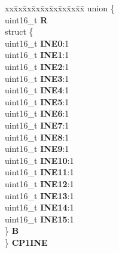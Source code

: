 \begin{DoxyCompactItemize}
\begin{tabbing}
\end{tabbing}\item 
\mbox{\label{structSEMA4__tag_aeee2d21a8dca272e9cb6f40deeca2ea8}} 
\begin{tabbing}
xx\=xx\=xx\=xx\=xx\=xx\=xx\=xx\=xx\=\kill
union \{\\
\>uint16\_t {\bfseries R}\\
\>struct \{\\
\>\>uint16\_t {\bfseries INE0}:1\\
\>\>uint16\_t {\bfseries INE1}:1\\
\>\>uint16\_t {\bfseries INE2}:1\\
\>\>uint16\_t {\bfseries INE3}:1\\
\>\>uint16\_t {\bfseries INE4}:1\\
\>\>uint16\_t {\bfseries INE5}:1\\
\>\>uint16\_t {\bfseries INE6}:1\\
\>\>uint16\_t {\bfseries INE7}:1\\
\>\>uint16\_t {\bfseries INE8}:1\\
\>\>uint16\_t {\bfseries INE9}:1\\
\>\>uint16\_t {\bfseries INE10}:1\\
\>\>uint16\_t {\bfseries INE11}:1\\
\>\>uint16\_t {\bfseries INE12}:1\\
\>\>uint16\_t {\bfseries INE13}:1\\
\>\>uint16\_t {\bfseries INE14}:1\\
\>\>uint16\_t {\bfseries INE15}:1\\
\>\} {\bfseries B}\\
\} {\bfseries CP1INE}\\


\end{tabbing}
\end{DoxyCompactItemize}
